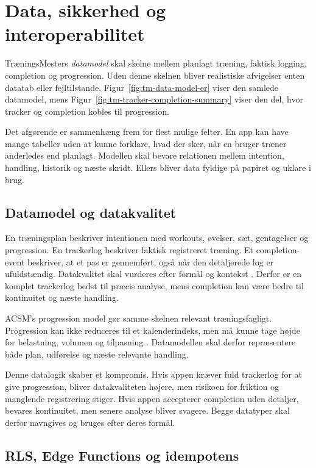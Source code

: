 \section{Data, sikkerhed og interoperabilitet}

TræningsMesters \emph{datamodel} skal skelne mellem planlagt træning, faktisk logging, completion og progression. Uden denne skelnen bliver realistiske afvigelser enten datatab eller fejltilstande. Figur~\ref{fig:tm-data-model-er} viser den samlede datamodel, mens Figur~\ref{fig:tm-tracker-completion-summary} viser den del, hvor tracker og completion kobles til progression.

Det afgørende er sammenhæng frem for flest mulige felter. En app kan have mange tabeller uden at kunne forklare, hvad der sker, når en bruger træner anderledes end planlagt. Modellen skal bevare relationen mellem intention, handling, historik og næste skridt. Ellers bliver data fyldige på papiret og uklare i brug.

\subsection{Datamodel og datakvalitet}

En træningsplan beskriver intentionen med workouts, øvelser, sæt, gentagelser og progression. En trackerlog beskriver faktisk registreret træning. Et completion-event beskriver, at et pas er gennemført, også når den detaljerede log er ufuldstændig. Datakvalitet skal vurderes efter formål og kontekst \cite{mohammed2025_five_facets_data_quality}. Derfor er en komplet trackerlog bedst til præcis analyse, mens completion kan være bedre til kontinuitet og næste handling.

ACSM's progression model gør samme skelnen relevant træningsfagligt. Progression kan ikke reduceres til et kalenderindeks, men må kunne tage højde for belastning, volumen og tilpasning \cite{acsm2009_progression_models}. Datamodellen skal derfor repræsentere både plan, udførelse og næste relevante handling.

Denne datalogik skaber et kompromis. Hvis appen kræver fuld trackerlog for at give progression, bliver datakvaliteten højere, men risikoen for friktion og manglende registrering stiger. Hvis appen accepterer completion uden detaljer, bevares kontinuitet, men senere analyse bliver svagere. Begge datatyper skal derfor navngives og bruges efter deres formål.

\subsection{RLS, Edge Functions og idempotens}

